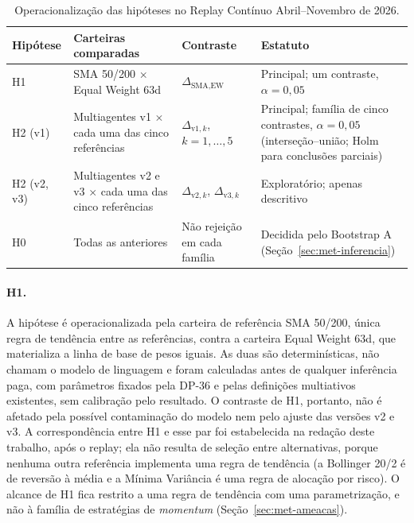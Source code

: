 \documentclass{eic-bcc-tcc}
\begin{document}
\begin{table}[htbp]
\centering
\caption{Operacionalização das hipóteses no Replay Contínuo Abril--Novembro de 2026.}
\label{tab:met-hipoteses}
\small
\begin{tabular}{>{\raggedright\arraybackslash}p{2.0cm} >{\raggedright\arraybackslash}p{4.6cm} >{\raggedright\arraybackslash}p{3.4cm} >{\raggedright\arraybackslash}p{4.6cm}}
\toprule
\textbf{Hipótese} & \textbf{Carteiras comparadas} & \textbf{Contraste} & \textbf{Estatuto} \\
\midrule
H1 & SMA 50/200 $\times$ Equal Weight 63d & $\Delta_{\text{SMA},\text{EW}}$ & Principal; um contraste, $\alpha = 0{,}05$ \\
H2 (v1) & Multiagentes v1 $\times$ cada uma das cinco referências & $\Delta_{\text{v1},k}$, $k = 1,\ldots,5$ & Principal; família de cinco contrastes, $\alpha = 0{,}05$ (interseção--união; Holm para conclusões parciais) \\
H2 (v2, v3) & Multiagentes v2 e v3 $\times$ cada uma das cinco referências & $\Delta_{\text{v2},k}$, $\Delta_{\text{v3},k}$ & Exploratório; apenas descritivo \\
H0 & Todas as anteriores & Não rejeição em cada família & Decidida pelo Bootstrap A (Seção~\ref{sec:met-inferencia}) \\
\bottomrule
\end{tabular}
\end{table}

\paragraph{H1.} A hipótese é operacionalizada pela carteira de referência SMA 50/200, única regra de tendência entre as referências, contra a carteira Equal Weight 63d, que materializa a linha de base de pesos iguais. As duas são determinísticas, não chamam o modelo de linguagem e foram calculadas antes de qualquer inferência paga, com parâmetros fixados pela DP-36 e pelas definições multiativos existentes, sem calibração pelo resultado. O contraste de H1, portanto, não é afetado pela possível contaminação do modelo nem pelo ajuste das versões v2 e v3. A correspondência entre H1 e esse par foi estabelecida na redação deste trabalho, após o replay; ela não resulta de seleção entre alternativas, porque nenhuma outra referência implementa uma regra de tendência (a Bollinger 20/2 é de reversão à média e a Mínima Variância é uma regra de alocação por risco). O alcance de H1 fica restrito a uma regra de tendência com uma parametrização, e não à família de estratégias de \textit{momentum} \citep{JegadeeshTitman1993, Moskowitz2012} (Seção~\ref{sec:met-ameacas}).
\end{document}
